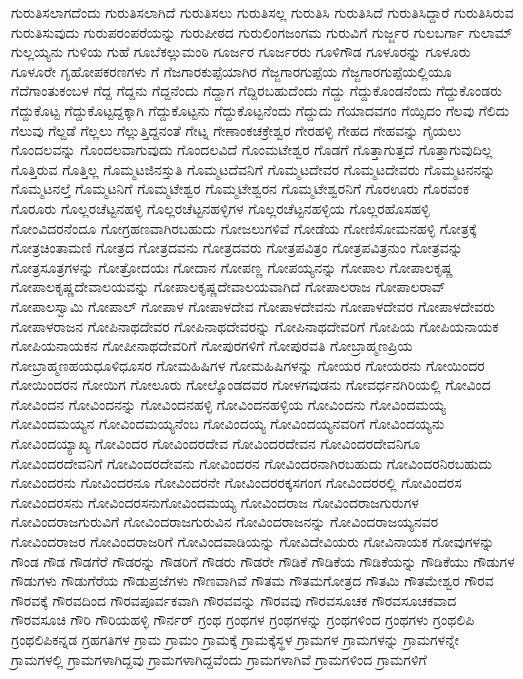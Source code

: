 {ಗುರುತಿಸಲಾಗದೆಂದು
ಗುರುತಿಸಲಾಗಿದೆ
ಗುರುತಿಸಲು
ಗುರುತಿಸಲ್ಲ
ಗುರುತಿಸಿ
ಗುರುತಿಸಿದೆ
ಗುರುತಿಸಿದ್ದಾರೆ
ಗುರುತಿಸಿರುವ
ಗುರುತಿಸುವುದು
ಗುರುಪರಂಪರೆಯನ್ನು
ಗುರುಪೀಠದ
ಗುರುಲಿಂಗಜಂಗಮ
ಗುರುವಿಗೆ
ಗುರ್ಜ್ಜರ
ಗುಲಬರ್ಗಾ
ಗುಲಾಮ್
ಗುಲ್ಲಯ್ಯನು
ಗುಳಿಯ
ಗುಹೆ
ಗೂಬೆಕಲ್ಲುಮಂಠಿ
ಗೂರ್ಜರ
ಗೂರ್ಜರರು
ಗೂಳಿಗೌಡ
ಗೂಳೂರನ್ನು
ಗೂಳೂರು
ಗೂಳೂರೇ
ಗೃಹೋಪಕರಣಗಳು
ಗೆ
ಗೆಜಗಾರಕುಪ್ಪೆಯಾಗಿರ
ಗೆಜ್ಜಗಾರಗುಪ್ಪೆಯ
ಗೆಜ್ಜಗಾರಗುಪ್ಪೆಯಲ್ಲಿಯೂ
ಗೆದೆಗಾಂತುಕಂಬಳ
ಗೆದ್ದ
ಗೆದ್ದನು
ಗೆದ್ದನೆಂದು
ಗೆದ್ದಾಗ
ಗೆದ್ದಿರಬಹುದೆಂದು
ಗೆದ್ದು
ಗೆದ್ದುಕೊಂಡನೆಂದು
ಗೆದ್ದುಕೊಂಡರು
ಗೆದ್ದುಕೊಟ್ಟ
ಗೆದ್ದುಕೊಟ್ಟದ್ದಕ್ಕಾಗಿ
ಗೆದ್ದುಕೊಟ್ಟನು
ಗೆದ್ದುಕೊಟ್ಟನೆಂದು
ಗೆದ್ದುದು
ಗೆಯಾದವಗಂ
ಗೆಯ್ಸಿದಂ
ಗೆಲವು
ಗೆಲಿದು
ಗೆಲುವು
ಗೆಲ್ದಡೆ
ಗೆಲ್ಲಲು
ಗೆಲ್ಲುತ್ತಿದ್ದನಂತೆ
ಗೇಟ್ನ
ಗೇಣಾಂಕಚಕ್ರೇಶ್ವರ
ಗೇರಹಳ್ಳಿ
ಗೇಹದ
ಗೇಹವನ್ನು
ಗೈಯಲು
ಗೊಂದಲವನ್ನು
ಗೊಂದಲವಾಗುವುದು
ಗೊಂದಲವಿದೆ
ಗೊಂಮಟೇಶ್ವರ
ಗೊಡಗೆ
ಗೊತ್ತಾಗುತ್ತದೆ
ಗೊತ್ತಾಗುವುದಿಲ್ಲ
ಗೊತ್ತಿರುವ
ಗೊತ್ತಿಲ್ಲ
ಗೊಮ್ಮಟಜಿನಸ್ತುತಿ
ಗೊಮ್ಮಟದೆವನಿಗೆ
ಗೊಮ್ಮಟದೇವರ
ಗೊಮ್ಮಟದೇವರು
ಗೊಮ್ಮಟನನನ್ನು
ಗೊಮ್ಮಟನಲ್ತೆ
ಗೊಮ್ಮಟನಿಗೆ
ಗೊಮ್ಮಟೇಶ್ವರ
ಗೊಮ್ಮಟೇಶ್ವರನ
ಗೊಮ್ಮಟೇಶ್ವರನಿಗೆ
ಗೊರಊರು
ಗೊರವಂಕ
ಗೊರೂರು
ಗೊಲ್ಲರಚೆಟ್ಟನಹಳ್ಳಿ
ಗೊಲ್ಲರಚೆಟ್ಟನಹಳ್ಳಿಗಳ
ಗೊಲ್ಲರಚೆಟ್ಟನಹಳ್ಳಿಯ
ಗೊಲ್ಲರಹೊಸಹಳ್ಳಿ
ಗೋಂವಿದರನೆಂದೂ
ಗೋಗ್ರಹಣವಾಗಿರಬಹುದು
ಗೋಜಲುಗಳಿವೆ
ಗೋಡೆಯ
ಗೋಣಿಸೋಮನಹಳ್ಳಿ
ಗೋತ್ರಕ್ಕೆ
ಗೋತ್ರಚಿಂತಾಮಣಿ
ಗೋತ್ರದ
ಗೋತ್ರದವನು
ಗೋತ್ರದವರು
ಗೋತ್ರಪವಿತ್ರಂ
ಗೋತ್ರಪವಿತ್ರನುಂ
ಗೋತ್ರವನ್ನು
ಗೋತ್ರಸೂತ್ರಗಳನ್ನು
ಗೋತ್ರೋದಯಃ
ಗೋದಾನ
ಗೋಪಣ್ಣ
ಗೋಪಯ್ಯನನ್ನು
ಗೋಪಾಲ
ಗೋಪಾಲಕೃಷ್ಣ
ಗೋಪಾಲಕೃಷ್ಣದೇವಾಲಯವನ್ನು
ಗೋಪಾಲಕೃಷ್ಣದೇವಾಲಯವಾಗಿದೆ
ಗೋಪಾಲರಾಜ
ಗೋಪಾಲರಾವ್
ಗೋಪಾಲಸ್ವಾಮಿ
ಗೋಪಾಲ್
ಗೋಪಾಳ
ಗೋಪಾಳದೇವ
ಗೋಪಾಳದೇವನು
ಗೋಪಾಳದೇವರ
ಗೋಪಾಳದೇವರು
ಗೋಪಾಳರಾಜನ
ಗೋಪಿನಾಥದೇವರ
ಗೋಪಿನಾಥದೇವರನ್ನು
ಗೋಪಿನಾಥದೇವರಿಗೆ
ಗೋಪಿಯ
ಗೋಪಿಯನಾಯಕ
ಗೋಪಿಯನಾಯಕನ
ಗೋಪೀನಾಥದೇವರಿಗೆ
ಗೋಪುರಗಳಿಗೆ
ಗೋಪುರವತಿ
ಗೋಬ್ರಾಹ್ಮಣಪ್ರಿಯ
ಗೋಬ್ರಾಹ್ಮಣಹಯಧೂಳಿಧೂಸರ
ಗೋಮಹಿಷಿಗಳ
ಗೋಮಹಿಷಿಗಳನ್ನು
ಗೋಯರ
ಗೋಯರನು
ಗೋಯಿಂದರ
ಗೋಯಿಂದರನ
ಗೋಯಿಗ
ಗೋಲೂರು
ಗೋಲ್ಕೊಂಡದವರ
ಗೋಳಗವುಡನು
ಗೋವರ್ಧನಗಿರಿಯಲ್ಲಿ
ಗೋವಿಂದ
ಗೋವಿಂದನ
ಗೋವಿಂದನನ್ನು
ಗೋವಿಂದನಹಳ್ಳಿ
ಗೋವಿಂದನಹಳ್ಳಿಯ
ಗೋವಿಂದನು
ಗೋವಿಂದಮಯ್ಯ
ಗೋವಿಂದಮಯ್ಯನ
ಗೋವಿಂದಮಯ್ಯನೆಂಬ
ಗೋವಿಂದಯ್ಯ
ಗೋವಿಂದಯ್ಯನವರಿಗೆ
ಗೋವಿಂದಯ್ಯನು
ಗೋವಿಂದಯ್ಯಾಖ್ಯ
ಗೋವಿಂದರ
ಗೋವಿಂದರದೇವ
ಗೋವಿಂದರದೇವನ
ಗೋವಿಂದರದೇವನಿಗೂ
ಗೋವಿಂದರದೇವನಿಗೆ
ಗೋವಿಂದರದೇವನು
ಗೋವಿಂದರನ
ಗೋವಿಂದರನಾಗಿರಬಹುದು
ಗೋವಿಂದರನಿರಬಹುದು
ಗೋವಿಂದರನು
ಗೋವಿಂದರನೂ
ಗೋವಿಂದರನೇ
ಗೋವಿಂದರರಕ್ಕಸಗಂಗ
ಗೋವಿಂದರರಲ್ಲಿ
ಗೋವಿಂದರಸ
ಗೋವಿಂದರಸನು
ಗೋವಿಂದರಸನುಗೋವಿಂದಮಯ್ಯ
ಗೋವಿಂದರಾಜ
ಗೋವಿಂದರಾಜಗುರುಗಳ
ಗೋವಿಂದರಾಜಗುರುವಿಗೆ
ಗೋವಿಂದರಾಜಗುರುವಿನ
ಗೋವಿಂದರಾಜನನ್ನು
ಗೋವಿಂದರಾಜಯ್ಯನವರ
ಗೋವಿಂದರಾಜರ
ಗೋವಿಂದರಾಜರಿಗೆ
ಗೋವಿಂದವಾಡಿಯನ್ನು
ಗೋವಿದೇವಿಯರು
ಗೋವಿನಾಯಕ
ಗೋವುಗಳನ್ನು
ಗೌಂಡ
ಗೌಡ
ಗೌಡಗೆರೆ
ಗೌಡರನ್ನು
ಗೌಡರಿಗೆ
ಗೌಡರು
ಗೌಡರೇ
ಗೌಡಿಕೆ
ಗೌಡಿಕೆಯ
ಗೌಡಿಕೆಯನ್ನು
ಗೌಡಿಕೆಯು
ಗೌಡುಗಳ
ಗೌಡುಗಳು
ಗೌಡುಗೆರೆಯ
ಗೌಡುಪ್ರಜೆಗಳು
ಗೌಣವಾಗಿವೆ
ಗೌತಮ
ಗೌತಮಗೋತ್ರದ
ಗೌತಮಿ
ಗೌತಮೇಶ್ವರ
ಗೌರವ
ಗೌರವಕ್ಕೆ
ಗೌರವದಿಂದ
ಗೌರವಪೂರ್ವಕವಾಗಿ
ಗೌರವವನ್ನು
ಗೌರವವು
ಗೌರವಸೂಚಕ
ಗೌರವಸೂಚಕವಾದ
ಗೌರವಸೂಚಿ
ಗೌರಿ
ಗೌರಿಯಹಳ್ಳಿ
ಗೌರ್ನರ್
ಗ್ರಂಥ
ಗ್ರಂಥಗಳ
ಗ್ರಂಥಗಳನ್ನು
ಗ್ರಂಥಗಳಿಂದ
ಗ್ರಂಥಗಳು
ಗ್ರಂಥಲಿಪಿ
ಗ್ರಂಥಲಿಪಿಕನ್ನಡ
ಗ್ರಹಗತಿಗಳ
ಗ್ರಾಮ
ಗ್ರಾಮಂ
ಗ್ರಾಮಕ್ಕೆ
ಗ್ರಾಮಕ್ಕೆಸ್ಥಳ
ಗ್ರಾಮಗಳ
ಗ್ರಾಮಗಳನ್ನು
ಗ್ರಾಮಗಳನ್ನೇ
ಗ್ರಾಮಗಳಲ್ಲಿ
ಗ್ರಾಮಗಳಾಗಿದ್ದವು
ಗ್ರಾಮಗಳಾಗಿದ್ದವೆಂದು
ಗ್ರಾಮಗಳಾಗಿವೆ
ಗ್ರಾಮಗಳಿಂದ
ಗ್ರಾಮಗಳಿಗೆ
}
